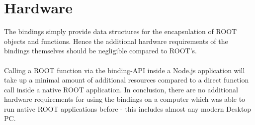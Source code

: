 \section{Hardware}

The bindings simply provide data structures for the encapsulation of ROOT objects and functions. Hence the additional hardware requirements of the bindings themselves 
should be negligible compared to ROOT's.\\ \\
Calling a ROOT function via the binding-API inside a Node.js application will take up a minimal amount of additional resources compared to a direct function call inside a native ROOT application.
In conclusion, there are no additional hardware requirements for using the bindings on a computer which was able to run native ROOT applications before - this includes almost any modern Desktop PC.
